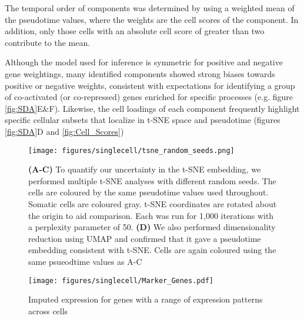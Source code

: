 The temporal order of components was determined by using a weighted mean of the pseudotime values, where the weights are the cell scores of the component.
In addition, only those cells with an absolute cell score of greater than two contribute to the mean.

Although the model used for inference is symmetric for positive and negative gene weightings, many identified components showed strong biases towards positive or negative weights, consistent with expectations for identifying a group of co-activated (or co-repressed) genes enriched for specific processes (e.g. figure \ref{fig:SDA}E\&F).
Likewise, the cell loadings of each component frequently highlight specific cellular subsets that localize in t-SNE space and pseudotime (figures \ref{fig:SDA}D and \ref{fig:Cell_Scores})


\begin{figure}[H]
	\centering
	\texttt{[image: figures/singlecell/tsne\_random\_seeds.png]}
	\caption[t-SNE random seed stability]{
		\textbf{(A-C)} To quantify our uncertainty in the t-SNE embedding, we performed multiple t-SNE analyses with different random seeds.
			The cells are coloured by the same pseudotime values used throughout.
			Somatic cells are coloured gray.
			t-SNE coordinates are rotated about the origin to aid comparison.
			Each was run for 1,000 iterations with a perplexity parameter of 50.
		\textbf{(D)} We also performed dimensionality reduction using UMAP and confirmed that it gave a pseudotime embedding consistent with t-SNE.
			Cells are again coloured using the same psueodtime values as A-C}
	\label{fig:tSNEseeds}
\end{figure}

\begin{figure}[H]
	\centering
	\texttt{[image: figures/singlecell/Marker\_Genes.pdf]}
	\caption[Marker Genes]{Imputed expression for genes with a range of expression patterns across cells}
	\label{fig:Marker_Genes}
\end{figure}

